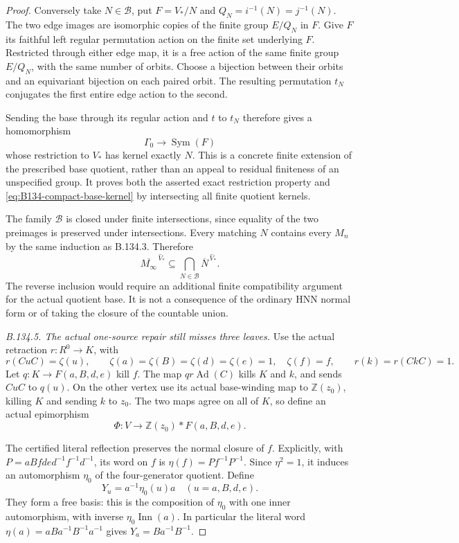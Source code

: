 \begin{proof}
Conversely take $N\in\mathcal B$, put $F=V_*/N$ and
$Q_N=i^{-1}(N)=j^{-1}(N)$. The two edge images are isomorphic
copies of the finite group $E/Q_N$ in $F$. Give $F$ its faithful
left regular permutation action on the finite set underlying $F$.
Restricted through either edge map, it is a free action of the
same finite group $E/Q_N$, with the same number of orbits.
Choose a bijection between their orbits and an equivariant
bijection on each paired orbit. The resulting permutation
$t_N$ conjugates the first entire edge action to the second.

Sending the base through its regular action and $t$ to $t_N$
therefore gives a homomorphism
\[
 \Gamma_0\longrightarrow\operatorname{Sym}(F)
\]
whose restriction to $V_*$ has kernel exactly $N$.
This is a concrete finite extension of the prescribed base
quotient, rather than an appeal to residual finiteness of an
unspecified group. It proves both the asserted exact restriction
property and \eqref{eq:B134-compact-base-kernel} by intersecting
all finite quotient kernels.

The family $\mathcal B$ is closed under finite intersections,
since equality of the two preimages is preserved under
intersections. Every matching $N$ contains every $M_n$ by the
same induction as B.134.3. Therefore
\[
 \overline{M_\infty}^{\,\widehat V_*}
       \subseteq\bigcap_{N\in\mathcal B}\overline N^{\,\widehat V_*}.
\]
The reverse inclusion would require an additional finite
compatibility argument for the actual quotient base. It is
not a consequence of the ordinary HNN normal form or of
taking the closure of the countable union.

\emph{B.134.5. The actual one-source repair still misses three leaves.}
Use the actual retraction $r:R^0\to K$, with
\[
 r(CuC)=\zeta(u),\qquad
 \zeta(a)=\zeta(B)=\zeta(d)=\zeta(e)=1,\quad\zeta(f)=f,
 \qquad r(k)=r(CkC)=1.
\]
Let $q:K\to F(a,B,d,e)$ kill $f$. The map
$q r\operatorname{Ad}(C)$ kills $K$ and $k$, and sends
$CuC$ to $q(u)$. On the other vertex use its actual
base-winding map to $\mathbb Z(z_0)$, killing $K$ and
sending $k$ to $z_0$. The two maps agree on all of $K$,
so define an actual epimorphism
\begin{equation}\label{eq:B134-Phi}
 \Phi:V\longrightarrow\mathbb Z(z_0)*F(a,B,d,e).
\end{equation}

The certified literal reflection preserves the normal closure
of $f$. Explicitly, with
$P=aBfde d^{-1}f^{-1}d^{-1}$, its word on $f$ is
$\eta(f)=Pf^{-1}P^{-1}$. Since $\eta^2=1$, it induces an
automorphism $\eta_0$ of the four-generator quotient.
Define
\[
 Y_u=a^{-1}\eta_0(u)a\quad(u=a,B,d,e).
\]
They form a free basis: this is the composition of $\eta_0$
with one inner automorphism, with inverse
$\eta_0\operatorname{Inn}(a)$. In particular the literal word
$\eta(a)=aBa^{-1}B^{-1}a^{-1}$ gives
$Y_a=Ba^{-1}B^{-1}$.


\end{proof}
